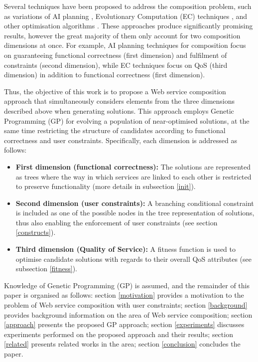 \documentclass[conference]{IEEEtran}
\begin{document}
Several techniques have been proposed to address the composition problem, such as variations of AI planning \cite{chen2014qos}, Evolutionary
Computation (EC) techniques \cite{wang2012survey}, and other optimisation algorithms \cite{pop2010immune}. These approaches produce significantly promising results,
however the great majority of them only account for two composition dimensions at once. For example, AI planning techniques for
composition focus on guaranteeing functional correctness (first dimension) and fulfilment of constraints (second dimension),
while EC techniques focus on QoS (third dimension) in addition to functional correctness (first dimension).

Thus, the objective of this work is to propose a Web service composition approach that simultaneously considers elements from the three dimensions
described above when generating solutions. This approach employs Genetic Programming (GP) for evolving a population of near-optimised solutions,
at the same time restricting the structure of candidates according to functional correctness and user constraints. Specifically, each dimension
is addressed as follows:

\begin{itemize}
 \item \textbf{First dimension (functional correctness):} The solutions are represented as trees where the way in which services are linked
 to each other is restricted to preserve functionality (more details in subsection \ref{init}).
 \item \textbf{Second dimension (user constraints):} A branching conditional constraint is included as one of the possible nodes in the tree
 representation of solutions, thus also enabling the enforcement of user constraints (see section \ref{constructs}).
 \item \textbf{Third dimension (Quality of Service):} A fitness function is used to optimise candidate solutions with regards to their overall
 QoS attributes (see subsection \ref{fitness}).
\end{itemize}

Knowledge of Genetic Programming (GP)\cite{banzhaf1998genetic} is assumed, and the remainder of this paper is organised as follows: section \ref{motivation} provides a 
motivation to the problem of Web service composition with user constraints; section \ref{background} provides background information on the 
area of Web service composition; section \ref{approach} presents the proposed GP approach; section \ref{experiments} discusses experiments performed on the 
proposed approach and their results; section \ref{related} presents related works in the area; section \ref{conclusion} concludes the paper.
\end{document}
